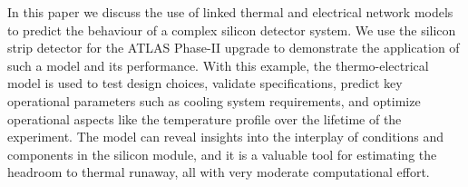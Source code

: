 
%
%

In this paper we discuss the use of linked thermal and electrical network models to predict the behaviour of a complex silicon detector system. We use the silicon strip detector for the ATLAS Phase-II upgrade to demonstrate the application of such a model and its performance. With this example, the thermo-electrical model is used to test design choices, validate specifications, predict key operational parameters such as cooling system requirements, and optimize operational aspects like the temperature profile over the lifetime of the experiment. The model can reveal insights into the interplay of conditions and components in the silicon module, and it is a valuable tool for estimating the headroom to thermal runaway, all with very moderate computational effort.
